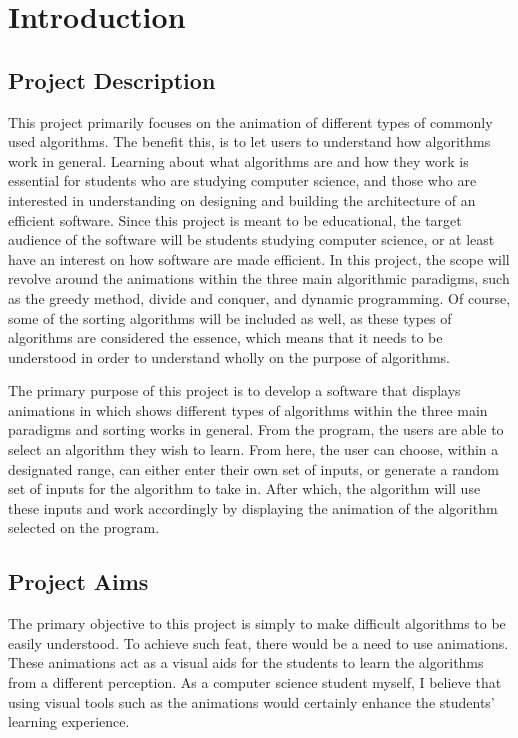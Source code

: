 \chapter{Introduction}

\section{Project Description}
This project primarily focuses on the animation of different types of commonly used algorithms. The benefit this, is to let users to understand how algorithms work in general. Learning about what algorithms are and how they work is essential for students who are studying computer science, and those who are interested in understanding on designing and building the architecture of an efficient software.  Since this project is meant to be educational, the target audience of the software will be students studying computer science, or at least have an interest on how software are made efficient. In this project, the scope will revolve around the animations within the three main algorithmic paradigms, such as the greedy method, divide and conquer, and dynamic programming. Of course, some of the sorting algorithms will be included as well, as these types of algorithms are considered the essence, which means that it needs to be understood in order to understand wholly on the purpose of algorithms.

The primary purpose of this project is to develop a software that displays animations in which shows different types of algorithms within the three main paradigms and sorting works in general. From the program, the users are able to select an algorithm they wish to learn. From here, the user can choose, within a designated range, can either enter their own set of inputs, or generate a random set of inputs for the algorithm to take in. After which, the algorithm will use these inputs and work accordingly by displaying the animation of the algorithm selected on the program.

\section{Project Aims}
The primary objective to this project is simply to make difficult algorithms to be easily understood. To achieve such feat, there would be a need to use animations. These animations act as a visual aids for the students to learn the algorithms from a different perception. As a computer science student myself, I believe that using visual tools such as the animations would certainly enhance the students' learning experience. 

